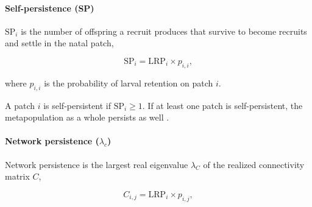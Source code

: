 \documentclass[12pt, oneside]{article}   	%
\begin{document}
\paragraph*{Self-persistence (SP)} 

$\text{SP}_i$ is the number of offspring a recruit produces that survive to become recruits and settle in the natal patch,

\begin{equation}
\text{SP}_i = \text{LRP}_i \times p_{i,i}, \label{EQN_SP}  %
\end{equation}

where $p_{i,i}$ is the probability of larval retention on patch $i$.

A patch $i$ is self-persistent if $\text{SP}_i \geq 1$. If at least one patch is self-persistent, the metapopulation as a whole persists as well \citep{hastings_persistence_2006, burgess2014beyond}. 


\paragraph*{Network persistence ($\lambda_c$)}

Network persistence is the largest real eigenvalue $\lambda_C$ of the realized connectivity matrix $C$,

\begin{equation}
C_{i,j} = \text{LRP}_i \times p_{i,j}, \label{EQN_Connectivity_matrix}
\end{equation} 
\end{document}
